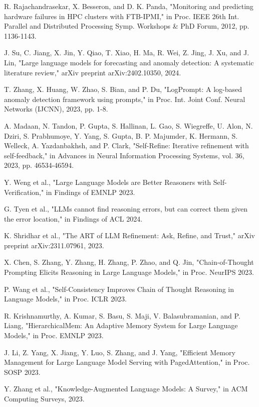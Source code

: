 \documentclass[conference]{IEEEtran}
\begin{document}
\begin{thebibliography}{00}
 R. Rajachandrasekar, X. Besseron, and D. K. Panda, "Monitoring and predicting hardware failures in HPC clusters with FTB-IPMI," in Proc. IEEE 26th Int. Parallel and Distributed Processing Symp. Workshops \& PhD Forum, 2012, pp. 1136-1143.

 J. Su, C. Jiang, X. Jin, Y. Qiao, T. Xiao, H. Ma, R. Wei, Z. Jing, J. Xu, and J. Lin, "Large language models for forecasting and anomaly detection: A systematic literature review," arXiv preprint arXiv:2402.10350, 2024.

 T. Zhang, X. Huang, W. Zhao, S. Bian, and P. Du, "LogPrompt: A log-based anomaly detection framework using prompts," in Proc. Int. Joint Conf. Neural Networks (IJCNN), 2023, pp. 1-8.

 A. Madaan, N. Tandon, P. Gupta, S. Hallinan, L. Gao, S. Wiegreffe, U. Alon, N. Dziri, S. Prabhumoye, Y. Yang, S. Gupta, B. P. Majumder, K. Hermann, S. Welleck, A. Yazdanbakhsh, and P. Clark, "Self-Refine: Iterative refinement with self-feedback," in Advances in Neural Information Processing Systems, vol. 36, 2023, pp. 46534-46594.

 Y. Weng et al., "Large Language Models are Better Reasoners with Self-Verification," in Findings of EMNLP 2023.

 G. Tyen et al., "LLMs cannot find reasoning errors, but can correct them given the error location," in Findings of ACL 2024.

 K. Shridhar et al., "The ART of LLM Refinement: Ask, Refine, and Trust," arXiv preprint arXiv:2311.07961, 2023.

 X. Chen, S. Zhang, Y. Zhang, H. Zhang, P. Zhao, and Q. Jin, "Chain-of-Thought Prompting Elicits Reasoning in Large Language Models," in Proc. NeurIPS 2023.

 P. Wang et al., "Self-Consistency Improves Chain of Thought Reasoning in Language Models," in Proc. ICLR 2023.

 R. Krishnamurthy, A. Kumar, S. Basu, S. Maji, V. Balasubramanian, and P. Liang, "HierarchicalMem: An Adaptive Memory System for Large Language Models," in Proc. EMNLP 2023.

 J. Li, Z. Yang, X. Jiang, Y. Luo, S. Zhang, and J. Yang, "Efficient Memory Management for Large Language Model Serving with PagedAttention," in Proc. SOSP 2023.

 Y. Zhang et al., "Knowledge-Augmented Language Models: A Survey," in ACM Computing Surveys, 2023.


\end{thebibliography}
\end{document}
